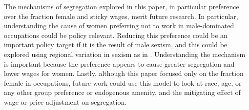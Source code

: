 \documentclass[12pt]{article}
\begin{document}
The mechanisms of segregation explored in this paper, in particular preference over the fraction female and sticky wages, merit future research. In particular, understanding the cause of women preferring not to work in male-dominated occupations could be policy relevant. Reducing this preference could be an important policy target if it is the result of male sexism, and this could be explored using regional variation in sexism as in . Understanding the mechanism is important because the preference appears to cause greater segregation and lower wages for women. Lastly, although this paper focused only on the fraction female in occupations,  future work could use this model to look at race, age, or any other group preference or endogenous amenity, and the mitigating effect of wage or price adjustment on segregation.


	




\end{document}
